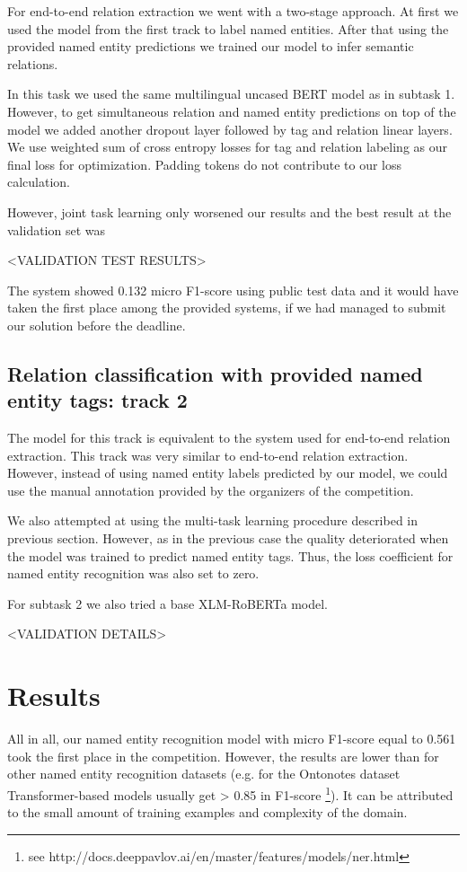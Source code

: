 \documentclass{dialogue}
\begin{document}
For end-to-end relation extraction we went with a two-stage approach. At first we used the model from the first track to label named entities. After that using the provided named entity predictions we trained our model to infer semantic relations.

In this task we used the same multilingual uncased BERT model as in subtask 1. However, to get simultaneous relation and named entity predictions on top of the model we added another dropout layer followed by tag and relation linear layers. We use weighted sum of cross entropy losses for tag and relation labeling as our final loss for optimization. Padding tokens do not contribute to our loss calculation.

However, joint task learning only worsened our results and the best result at the validation set was

<VALIDATION TEST RESULTS>

The system showed 0.132 micro F1-score using public test data and it would have taken the first place among the provided systems, if we had managed to submit our solution before the deadline.
\subsection{Relation classification with provided named entity tags: track 2}
The model for this track is equivalent to the system used for end-to-end relation extraction. This track was very similar to end-to-end relation extraction. However, instead of using named entity labels predicted by our model, we could use the manual annotation provided by the organizers of the competition.

We also attempted at using the multi-task learning procedure described in previous section. However, as in the previous case the quality deteriorated when the model was trained to predict named entity tags. Thus, the loss coefficient for named entity recognition was also set to zero.

For subtask 2 we also tried a base XLM-RoBERTa model. 

<VALIDATION DETAILS>

\section{Results}
All in all, our named entity recognition model with micro F1-score equal to 0.561 took the first place in the competition. However, the results are lower than for other named entity recognition datasets (e.g. for the Ontonotes dataset Transformer-based models usually get > 0.85 in F1-score \footnote{see http://docs.deeppavlov.ai/en/master/features/models/ner.html}). It can be attributed to the small amount of training examples and complexity of the domain.
\end{document}
